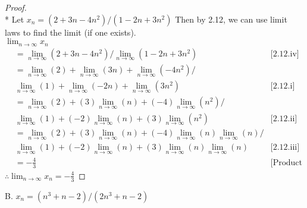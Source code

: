 \documentclass[a4paper]{article}
\begin{document}
\begin{flushleft}
        \begin{proof}\mbox{}\\*
            Let $x_n = (2 + 3n-4n^2)/ (1-2n + 3n^2)$ Then by 2.12, we can use limit laws to find the limit (if one exists). \\
            $\lim_{n \to \infty} x_n$ \\
            \begin{align*}
                &= \lim_{n \to \infty} (2 + 3n-4n^2)/ \lim_{n \to \infty}(1-2n + 3n^2) &\text{[2.12.iv]}\\
                &= \lim_{n \to \infty} (2) + \lim_{n \to \infty} (3n) + \lim_{n \to \infty} (-4n^2) / \\
                &      \lim_{n \to \infty}(1) + \lim_{n \to \infty} (-2n) + \lim_{n \to \infty}(3n^2)   &\text{[2.12.i]} \\
                &= \lim_{n \to \infty} (2) + (3)\lim_{n \to \infty} (n) + (-4)\lim_{n \to \infty} (n^2) / \\
                &      \lim_{n \to \infty}(1) + (-2)\lim_{n \to \infty} (n) + (3)\lim_{n \to \infty}(n^2)   &\text{[2.12.ii]} \\
                &= \lim_{n \to \infty} (2) + (3)\lim_{n \to \infty} (n) + (-4)\lim_{n \to \infty} (n)\lim_{n \to \infty} (n) / \\
                &      \lim_{n \to \infty}(1) + (-2)\lim_{n \to \infty} (n) + (3)\lim_{n \to \infty} (n)\lim_{n \to \infty} (n)   &\text{[2.12.iii]} \\
                &= -\frac{4}{3} &\text{[Product Law + Algebra]}
            \end{align*}
            $\therefore \lim_{n \to \infty} x_n = -\frac{4}{3}$
        \end{proof}

        B. $x_n = (n^3 + n-2)/(2n^3 + n-2)$


\end{flushleft}
\end{document}
